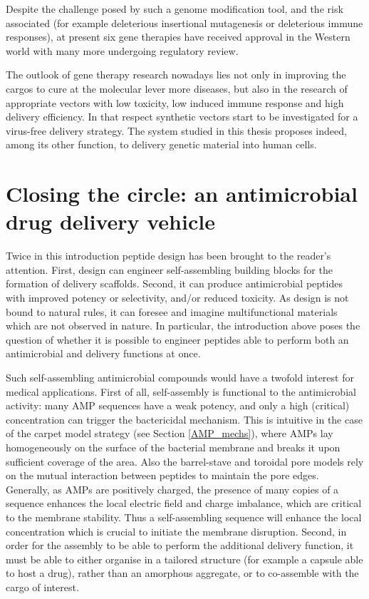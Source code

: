 Despite the challenge posed by such a genome modification tool, and the risk associated (for example deleterious insertional mutagenesis or deleterious immune responses), at present six gene therapies have received approval in the Western world \cite{Anguela2019} with many more undergoing regulatory review. 

The outlook of gene therapy research nowadays lies not only in improving the cargos to cure at the molecular lever more diseases, but also in the research of appropriate vectors with low toxicity, low induced immune response and high delivery efficiency. In that respect synthetic vectors start to be investigated for a virus-free delivery strategy. The system studied in this thesis proposes indeed, among its other function, to delivery genetic material into human cells.


\section{Closing the circle: an antimicrobial drug delivery vehicle}

Twice in this introduction peptide design has been brought to the reader's attention. First, design can engineer self-assembling building blocks for the formation of delivery scaffolds. Second, it can produce antimicrobial peptides with improved potency or selectivity, and/or reduced toxicity. As design is not bound to natural rules, it can foresee and imagine multifunctional materials which are not observed in nature. In particular, the introduction above poses the question of whether it is possible to engineer peptides able to perform both an antimicrobial and delivery functions at once.

Such self-assembling antimicrobial compounds would have a twofold interest for medical applications.
%
First of all, self-assembly is functional to the antimicrobial activity: many AMP sequences have a weak potency, and only a high (critical) concentration can trigger the bactericidal mechanism. This is intuitive in the case of the carpet model strategy (see Section \ref{AMP_mechs}), where AMPs lay homogeneously on the surface of the bacterial membrane and breaks it upon sufficient coverage of the area. Also the barrel-stave and toroidal pore models rely on the mutual interaction between peptides to maintain the pore edges.
%
Generally, as AMPs are positively charged, the presence of many copies of a sequence enhances the local electric field and charge imbalance, which are critical to the membrane stability. Thus a self-assembling sequence will enhance the local concentration which is crucial to initiate the membrane disruption.
%
Second, in order for the assembly to be able to perform the additional delivery function, it must be able to either organise in a tailored structure (for example a capsule able to host a drug), rather than an amorphous aggregate, or to co-assemble with the cargo of interest.

